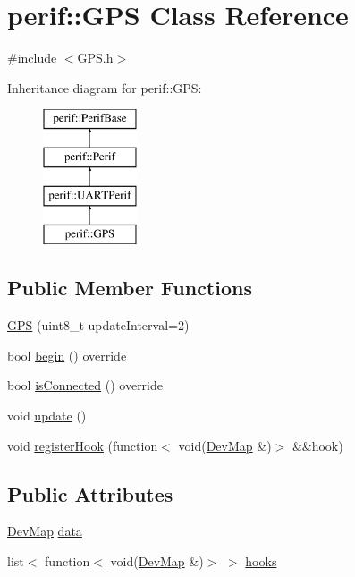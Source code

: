 \hypertarget{classperif_1_1GPS}{}\section{perif\+::G\+PS Class Reference}
\label{classperif_1_1GPS}


{\ttfamily \#include $<$G\+P\+S.\+h$>$}

Inheritance diagram for perif\+::G\+PS\+:\begin{figure}[H]
\begin{center}
\leavevmode
\includegraphics[height=4.000000cm]{classperif_1_1GPS}
\end{center}
\end{figure}
\subsection*{Public Member Functions}
\begin{DoxyCompactItemize}
\item 
\mbox{\hyperlink{classperif_1_1GPS_aa853a974f31d5d7cfa22c86ebd57a03a}{G\+PS}} (uint8\+\_\+t update\+Interval=2)
\item 
bool \mbox{\hyperlink{classperif_1_1GPS_add9ec977f37224c9f2e87c5a932a55bd}{begin}} () override
\item 
bool \mbox{\hyperlink{classperif_1_1UARTPerif_a14c1fdcd81cd9a5eac9d4c0ac9863b66}{is\+Connected}} () override
\item 
void \mbox{\hyperlink{classperif_1_1Perif_ad6fe1a13354bba4af4cc2751399ed93c}{update}} ()
\item 
void \mbox{\hyperlink{classperif_1_1PerifBase_a2e8bcc221ee253b21b61c7c07307d931}{register\+Hook}} (function$<$ void(\mbox{\hyperlink{Perif_8hpp_a358ff4ee6d24694ee7661f0cce14377e}{Dev\+Map}} \&)$>$ \&\&hook)
\end{DoxyCompactItemize}
\subsection*{Public Attributes}
\begin{DoxyCompactItemize}
\item 
\mbox{\hyperlink{Perif_8hpp_a358ff4ee6d24694ee7661f0cce14377e}{Dev\+Map}} \mbox{\hyperlink{classperif_1_1PerifBase_a1a3afaa535fda17e9f97123fffe78765}{data}}
\item 
list$<$ function$<$ void(\mbox{\hyperlink{Perif_8hpp_a358ff4ee6d24694ee7661f0cce14377e}{Dev\+Map}} \&)$>$ $>$ \mbox{\hyperlink{classperif_1_1PerifBase_a98964e5ca8384df64881265e0aa6d7b6}{hooks}}
\end{DoxyCompactItemize}
